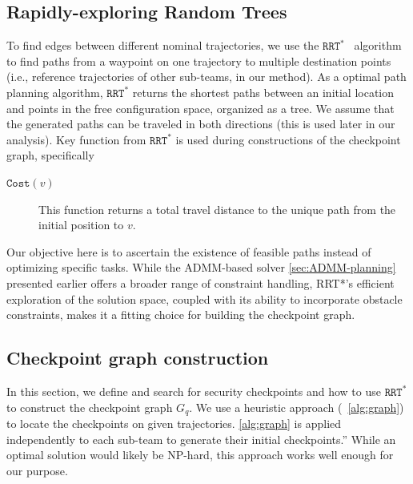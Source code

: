 \documentclass[10pt,twocolumn,twoside]{IEEEtran}
\newcommand{\rrtstar}{$\texttt{RRT}^\texttt{*}$}
\newcommand{\news}{\color{blue}}
\begin{document}
\subsection{Rapidly-exploring Random Trees}
To find edges between different nominal trajectories, we use the \rrtstar{}~\cite{karaman2010incremental} algorithm to find paths from a waypoint on one trajectory to multiple destination points (i.e., reference trajectories of other sub-teams, in our method). As a optimal path planning algorithm, \rrtstar{} returns the shortest paths between an initial location and points in the free configuration space, organized as a tree. We assume that the generated paths can be traveled in both directions (this is used later in our analysis). 
Key function from \rrtstar{} is used during constructions of the checkpoint graph, specifically
{\news\begin{description}
\item[$\texttt{Cost}(v)$] This function returns a total travel distance to the unique path from the initial position to $v$. 
\end{description}}

Our objective here is to ascertain the existence of feasible paths instead of optimizing specific tasks. While the ADMM-based solver \cref{sec:ADMM-planning} presented earlier offers a broader range of constraint handling, RRT*'s efficient exploration of the solution space, coupled with its ability to incorporate obstacle constraints, makes it a fitting choice for building the checkpoint graph.

\subsection{Checkpoint graph construction}\label{sec:security-checkpoint}

In this section, we define and search for security checkpoints and how to use \rrtstar{} to construct the checkpoint graph $G_{q}$.
{\news We use a heuristic approach (~\cref{alg:graph}) to locate the checkpoints on given trajectories. \cref{alg:graph} is applied independently to each sub-team to generate their initial checkpoints.” While an optimal solution would likely be NP-hard, this approach works well enough for our purpose.} %
\end{document}
